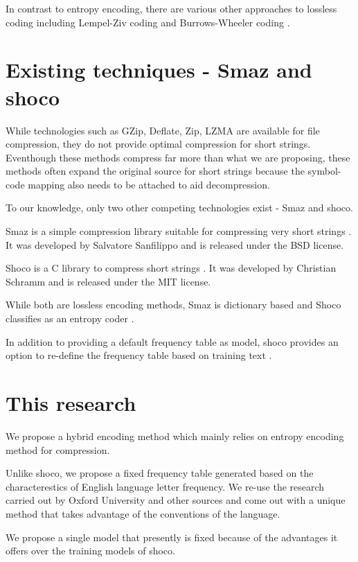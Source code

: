 \documentclass[]{article}
\begin{document}
In contrast to entropy encoding, there are various other approaches to lossless coding including Lempel-Ziv coding \cite{4} and Burrows-Wheeler coding \cite{5}.

\section{Existing techniques - Smaz and shoco}

While technologies such as GZip, Deflate, Zip, LZMA are available for file compression, they do not provide optimal compression for short strings.  Eventhough these methods compress far more than what we are proposing, these methods often expand the original source for short strings because the symbol-code mapping also needs to be attached to aid decompression.

To our knowledge, only two other competing technologies exist - Smaz and shoco.

Smaz is a simple compression library suitable for compressing very short strings \cite{9}. It was developed by Salvatore Sanfilippo and is released under the BSD license.

Shoco is a C library to compress short strings \cite{10}. It was developed by Christian Schramm and is released under the MIT license.

While both are lossless encoding methods, Smaz is dictionary based and Shoco classifies as an entropy coder \cite{10}.

In addition to providing a default frequency table as model, shoco provides an option to re-define the frequency table based on training text \cite{10}.

\section{This research}

We propose a hybrid encoding method which mainly relies on entropy encoding method for compression.

Unlike shoco, we propose a fixed frequency table generated based on the characterestics of English language letter frequency.  We re-use the research carried out by Oxford University \cite{7} and other sources \cite{6} \cite{8} and come out with a unique method that takes advantage of the conventions of the language.

We propose a single model that presently is fixed because of the advantages it offers over the training models of shoco.
\end{document}

